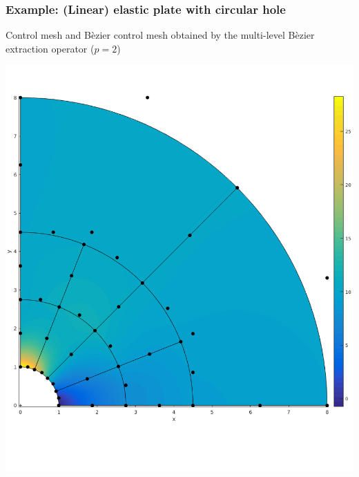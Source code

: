 \documentclass{beamer}
\begin{document}
\begin{frame}
	\frametitle{Example: (Linear) elastic plate with circular hole }%
	Control mesh and B\`ezier control mesh obtained by the multi-level B\`ezier extraction operator ($ p=2 $)\\
	\centering
	\begin{minipage}{0.49\textwidth}
		\centering
		\includegraphics[scale=0.24]{pics/plateWithAHole/plate_beziernet_2.png}
	\end{minipage}
	\begin{minipage}{0.49\textwidth}
		\centering

\end{minipage}
\end{frame}
\end{document}
